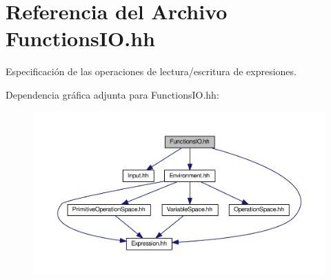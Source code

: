 \hypertarget{_functions_i_o_8hh}{}\section{Referencia del Archivo Functions\+I\+O.\+hh}
\label{_functions_i_o_8hh}


Especificación de las operaciones de lectura/escritura de expresiones.  


Dependencia gráfica adjunta para Functions\+I\+O.\+hh\+:
\nopagebreak
\begin{figure}[H]
\begin{center}
\leavevmode
\includegraphics[width=350pt]{_functions_i_o_8hh__incl}
\end{center}
\end{figure}
